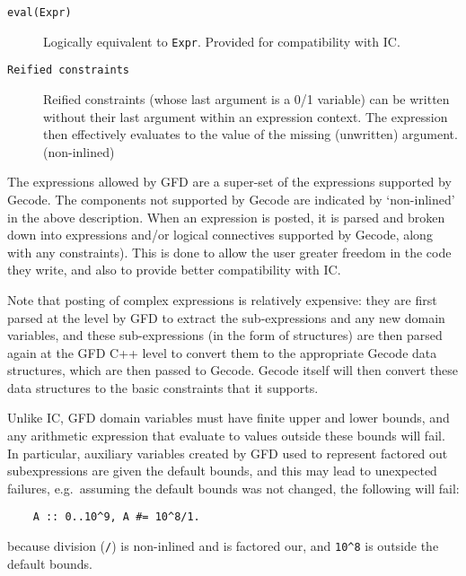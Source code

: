 \begin{description}
\item[\texttt{eval(Expr)}]
            Logically equivalent to \verb'Expr'. Provided for compatibility
	    with IC.

\item[\texttt{Reified constraints}]
            Reified constraints (whose last argument is a 0/1 variable)
            can be written without their last argument within
            an expression context.  The expression then effectively
            evaluates to the value of the missing (unwritten) argument.
	    (non-inlined)

\end{description}
 
The expressions allowed by GFD are a super-set of the expressions supported by 
Gecode. The components not supported by Gecode are indicated by `non-inlined'
in the above description. When an expression is posted, it is parsed and 
broken down into expressions and/or logical connectives supported by Gecode, 
along 
with any constraints). This is done to 
allow the user greater freedom in the code they write, and also to provide 
better compatibility with IC. 

Note that posting of complex expressions is relatively expensive: they are 
first parsed at the {\eclipse} level by GFD to extract the sub-expressions and 
any new domain variables, and these sub-expressions (in the form of 
{\eclipse} structures) are then parsed again at the GFD C++ level to convert
them to the appropriate Gecode data structures, which are then passed to
Gecode. Gecode itself will then convert these data structures
to the basic constraints that it supports. 

Unlike IC, GFD domain variables must have finite upper and lower 
bounds, and any arithmetic expression that evaluate to values outside
these bounds will fail. In particular, auxiliary variables created by GFD
used to represent factored out subexpressions are given the default bounds,
and this may lead to unexpected failures, e.g.\ assuming the default bounds
was not changed, the following will fail:
\begin{verbatim}
    A :: 0..10^9, A #= 10^8/1.
\end{verbatim}
\noindent
because division (\texttt{/}) is non-inlined and is factored our, and 
\verb|10^8| is outside the default bounds.




